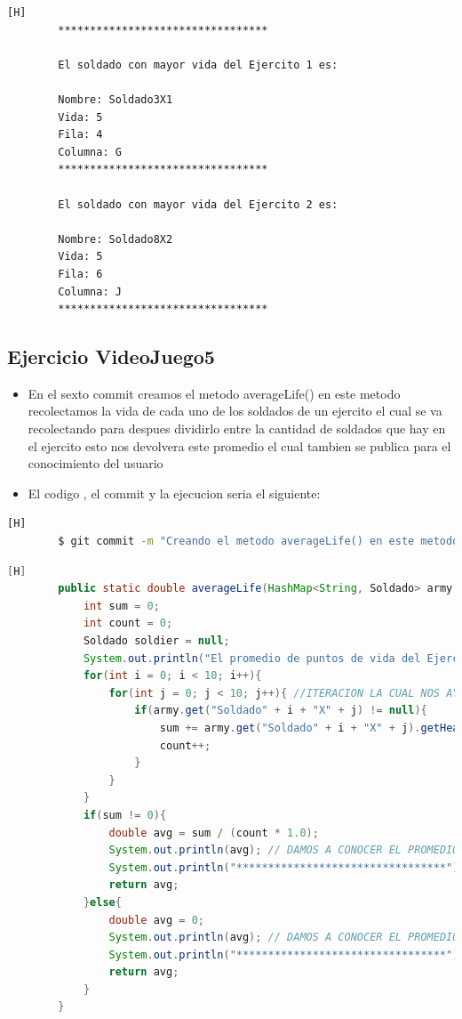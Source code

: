 \documentclass{article}
\begin{document}
	\begin{lstlisting}[language=bash,caption={Ejecucion:}][H]
		*********************************

		El soldado con mayor vida del Ejercito 1 es: 

		Nombre: Soldado3X1
		Vida: 5
		Fila: 4
		Columna: G
		*********************************

		El soldado con mayor vida del Ejercito 2 es: 

		Nombre: Soldado8X2
		Vida: 5
		Fila: 6
		Columna: J
		*********************************

	\end{lstlisting}
	\subsection{Ejercicio VideoJuego5}
	\begin{itemize}	
		\item En el sexto commit creamos el metodo averageLife() en este metodo recolectamos la vida de cada uno de los soldados de un ejercito el cual se va recolectando para despues dividirlo entre la cantidad de soldados que hay en el ejercito esto nos devolvera este promedio el cual tambien se publica para el conocimiento del usuario
		\item El codigo , el commit y la ejecucion seria el siguiente:
	\end{itemize}	
	\begin{lstlisting}[language=bash,caption={Commit}][H]
		$ git commit -m "Creando el metodo averageLife() en este metodo recolectamos la vida de cada uno de los soldados de un ejercito el cual se va recolectando para despues dividirlo entre la cantidad de soldados que hay en el ejercito esto nos devolvera este promedio el cual tambien se publica para el conocimiento del usuario"
	\end{lstlisting}	
	\begin{lstlisting}[language=java,caption={Las lineas de codigos del metodo creado:}][H]
		public static double averageLife(HashMap<String, Soldado> army , int num){
			int sum = 0;
			int count = 0;
			Soldado soldier = null;
			System.out.println("El promedio de puntos de vida del Ejercito " + num + " es: ");
			for(int i = 0; i < 10; i++){
				for(int j = 0; j < 10; j++){ //ITERACION LA CUAL NOS AYUDA A PASAR POR TODOS LOS SOLDADOS DE CADA EJERCITO
					if(army.get("Soldado" + i + "X" + j) != null){ 
						sum += army.get("Soldado" + i + "X" + j).getHealth();
						count++;
					}
				}
			}
			if(sum != 0){
				double avg = sum / (count * 1.0);
				System.out.println(avg); // DAMOS A CONOCER EL PROMEDIO DE VIDA DE CADA EJERCITO 
				System.out.println("*********************************");
				return avg;
			}else{
				double avg = 0;
				System.out.println(avg); // DAMOS A CONOCER EL PROMEDIO DE VIDA DE CADA EJERCITO 
				System.out.println("*********************************");
				return avg;
			}
		}
	\end{lstlisting}
\end{document}
